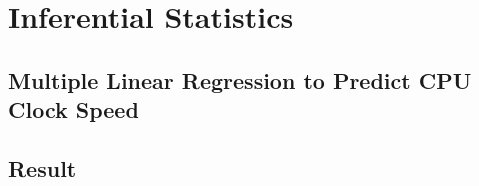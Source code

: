 \section{Inferential Statistics}

\subsection{Multiple Linear Regression to Predict CPU Clock Speed}

\subsection{Result}

\newpage